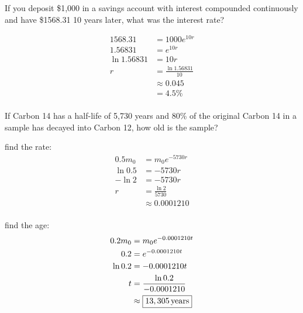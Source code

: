 \documentclass[fleqn,addpoints]{exam}
\begin{document}
\begin{questions}
    \ifprintanswers
      \pagebreak
    \fi

    \question[7]
      If you deposit \$1,000 in a savings account with interest compounded continuously and have \$1568.31 10 years later,
      what was the interest rate?

      \begin{solution}
        \begin{align*}
          1568.31     & = 1000 e^{10 r} \\
          1.56831     & = e^{10 r} \\
          \ln 1.56831 & = 10 r \\
          r           & = \frac{\ln 1.56831}{10} \\
                      & \approx 0.045 \\
                      & = \boxed{ 4.5\% } \\
        \end{align*}
      \end{solution}

    \question[10]
      If Carbon 14 has a half-life of 5,730 years and 80\% of the original Carbon 14 in a sample has decayed into Carbon
      12, how old is the sample?

      \begin{solution}
        find the rate:
        \begin{align*}
          0.5 m_0 & = m_0 e^{-5730r} \\
          \ln 0.5 & = -5730r \\
          - \ln 2 & = -5730r \\
          r       & = \frac{\ln 2}{5730} \\
                  & \approx 0.0001210 \\
        \end{align*}

        find the age:
        \begin{align*}
          0.2 m_0 & = m_0 e^{-0.0001210 t} \\
          0.2     & = e^{-0.0001210 t} \\
          \ln 0.2 & = -0.0001210 t \\
          t       & = \frac{\ln 0.2}{-0.0001210} \\
                  & \approx \boxed{ \unit[13,305]{years} } \\
        \end{align*}
      \end{solution}


\end{questions}
\end{document}
